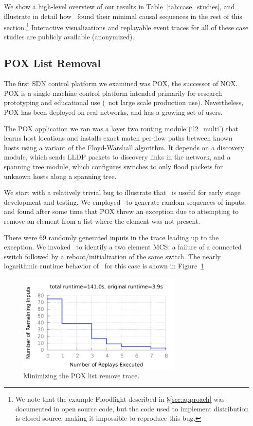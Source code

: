 We show a high-level overview
of our results in Table~\ref{tab:case_studies}, and
illustrate in detail how \simulator~found their minimal causal sequences
in the rest of this section.\footnote{We note that the example Floodlight
described in \S\ref{sec:approach} was documented in open source code, but
the code used to implement distribution is closed source, making it impossible
to reproduce this bug.} Interactive visualizations and replayable event traces
for all of these case studies are publicly available (anonymized).


\subsection{POX List Removal}
The first SDN control platform we examined was POX, the successor of NOX. POX is
a single-machine control platform intended primarily for research prototyping
and educational use (\ie~not large scale production use). Nevertheless, POX has
been deployed on real networks, and has a growing set of users.

The POX application we ran was a layer two routing module (`l2\_multi') that
learns host locations and installs exact match per-flow paths between known hosts using a variant of the
Floyd-Warshall algorithm. It depends on a discovery module, which sends
LLDP packets to discovery links in the network, and a spanning tree module,
which configures switches to only flood packets for unknown hosts along a
spanning tree.

We start with a relatively trivial bug to illustrate that
\projectname~is useful for early stage development and testing.
We employed \projectname~to generate random sequences of
inputs, and found after some time that POX threw an exception due to
attempting to remove an element from a list where the element was not present.

There were $69$ randomly generated inputs in the trace leading up to the
exception. We invoked \simulator~to identify a two element MCS:
a failure of a connected switch followed by a reboot/initialization of the same switch.
The nearly logarithmic runtime
behavior of \simulator~for this case is shown in Figure~\ref{fig:list_runtime}.

\begin{figure}[t]
    \includegraphics[width=3.25in]{../graphs/runtime/list_remove_error.pdf}
    \caption[]{\label{fig:list_runtime} Minimizing the POX list remove trace.}
\end{figure}

